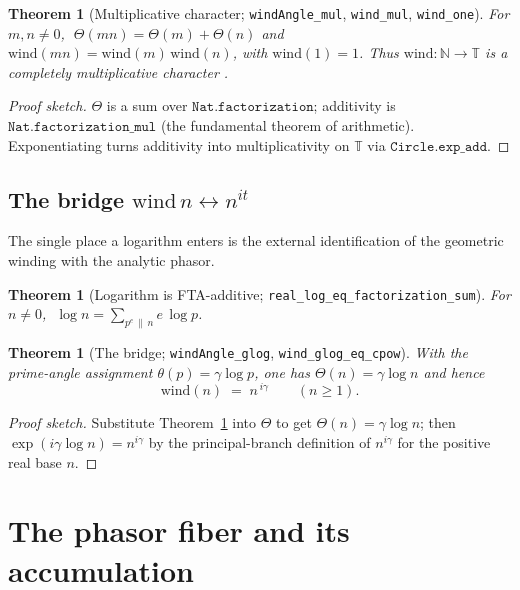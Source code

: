 \documentclass[11pt]{article}
\newtheorem{theorem}[definition]{Theorem}
\newcommand{\N}{\mathbb{N}}
\newcommand{\T}{\mathbb{T}}
\newcommand{\code}[1]{\texttt{#1}}
\begin{document}
\begin{theorem}[Multiplicative character; \code{windAngle\_mul}, \code{wind\_mul}, \code{wind\_one}]\label{thm:windmul}
For $m,n\neq 0$, $\;\Theta(mn)=\Theta(m)+\Theta(n)$ and $\mathrm{wind}(mn)=\mathrm{wind}(m)\,\mathrm{wind}(n)$,
with $\mathrm{wind}(1)=1$. Thus $\mathrm{wind}:\N\to\T$ is a completely multiplicative character
\cite{Apostol1976}.
\end{theorem}

\begin{proof}[Proof sketch]
$\Theta$ is a sum over $\code{Nat.factorization}$; additivity is $\code{Nat.factorization\_mul}$
(the fundamental theorem of arithmetic). Exponentiating turns additivity into multiplicativity on
$\T$ via $\code{Circle.exp\_add}$.
\end{proof}

\subsection{The bridge $\mathrm{wind}\,n\leftrightarrow n^{it}$}

The single place a logarithm enters is the external identification of the geometric winding with the
analytic phasor.

\begin{theorem}[Logarithm is FTA-additive; \code{real\_log\_eq\_factorization\_sum}]\label{thm:logfta}
For $n\neq 0$, $\;\log n=\sum_{p^{e}\,\|\,n} e\,\log p$.
\end{theorem}

\begin{theorem}[The bridge; \code{windAngle\_glog}, \code{wind\_glog\_eq\_cpow}]\label{thm:bridge}
With the prime-angle assignment $\theta(p)=\gamma\log p$, one has
$\Theta(n)=\gamma\log n$ and hence
\[
  \mathrm{wind}(n) \;=\; n^{\,i\gamma}\qquad(n\ge 1).
\]
\end{theorem}

\begin{proof}[Proof sketch]
Substitute Theorem~\ref{thm:logfta} into $\Theta$ to get $\Theta(n)=\gamma\log n$; then
$\exp(i\gamma\log n)=n^{i\gamma}$ by the principal-branch definition of $n^{i\gamma}$ for the
positive real base $n$.
\end{proof}

\section{The phasor fiber and its accumulation}\label{sec:fiber}
\end{document}
